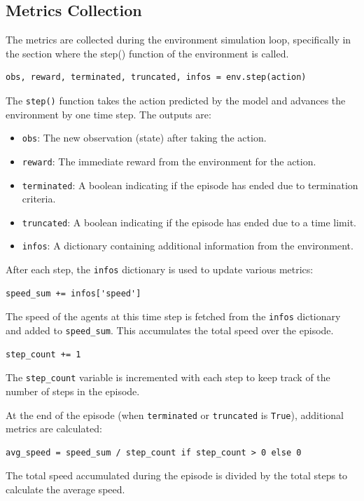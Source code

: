\subsection{Metrics Collection}

The metrics are collected during the environment simulation loop, specifically in the section where the step() function of the environment is called. 

\begin{lstlisting}[style=python]
obs, reward, terminated, truncated, infos = env.step(action)
\end{lstlisting}


The \texttt{step()} function takes the action predicted by the model and advances the environment by one time step. The outputs are:
\begin{itemize}
    \item \texttt{obs}: The new observation (state) after taking the action.
    \item \texttt{reward}: The immediate reward from the environment for the action.
    \item \texttt{terminated}: A boolean indicating if the episode has ended due to termination criteria.
    \item \texttt{truncated}: A boolean indicating if the episode has ended due to a time limit.
    \item \texttt{infos}: A dictionary containing additional information from the environment.
\end{itemize}

After each step, the \texttt{infos} dictionary is used to update various metrics:

\begin{verbatim}
speed_sum += infos['speed']
\end{verbatim}
The speed of the agents at this time step is fetched from the \texttt{infos} dictionary and added to \texttt{speed\_sum}. This accumulates the total speed over the episode.

\begin{verbatim}
step_count += 1
\end{verbatim}
The \texttt{step\_count} variable is incremented with each step to keep track of the number of steps in the episode.

At the end of the episode (when \texttt{terminated} or \texttt{truncated} is \texttt{True}), additional metrics are calculated:

\begin{verbatim}
avg_speed = speed_sum / step_count if step_count > 0 else 0
\end{verbatim}
The total speed accumulated during the episode is divided by the total steps to calculate the average speed.

